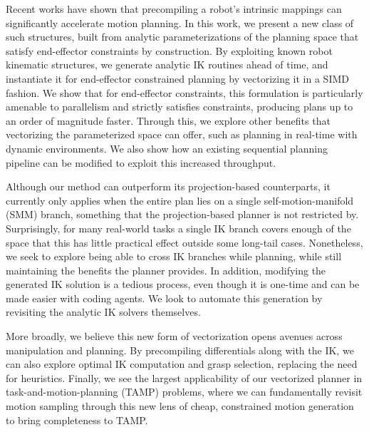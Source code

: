 \documentclass[letterpaper, 10 pt, conference]{ieeeconf}
\begin{document}
Recent works have shown that precompiling a robot's intrinsic mappings can significantly accelerate motion planning. In this work, we present a new class of such structures, built from analytic parameterizations of the planning space that satisfy end-effector constraints by construction. By exploiting known robot kinematic structures, we generate analytic IK routines ahead of time, and instantiate it for end-effector constrained planning by vectorizing it in a SIMD fashion. We show that for end-effector constraints, this formulation is particularly amenable to parallelism and strictly satisfies constraints, producing plans up to an order of magnitude faster. Through this, we explore other benefits that vectorizing the parameterized space can offer, such as planning in real-time with dynamic environments. We also show how an existing sequential planning pipeline can be modified to exploit this increased throughput.

Although our method can outperform its projection-based counterparts, it currently only applies when the entire plan lies on a single self-motion-manifold (SMM) branch, something that the projection-based planner is not restricted by. 
Surprisingly, for many real-world tasks a single IK branch covers enough of the space that this has little practical effect outside some long-tail cases. 
Nonetheless, we seek to explore being able to cross IK branches while planning, while still maintaining the benefits the planner provides.
In addition, modifying the generated IK solution is a tedious process, even though it is one-time and can be made easier with coding agents. 
We look to automate this generation by revisiting the analytic IK solvers themselves.

More broadly, we believe this new form of vectorization opens avenues across manipulation and planning. By precompiling differentials along with the IK, we can also explore optimal IK computation and grasp selection, replacing the need for heuristics. Finally, we see the largest applicability of our vectorized planner in task-and-motion-planning (TAMP) problems, where we can fundamentally revisit motion sampling through this new lens of cheap, constrained motion generation to bring completeness to TAMP.
\end{document}
